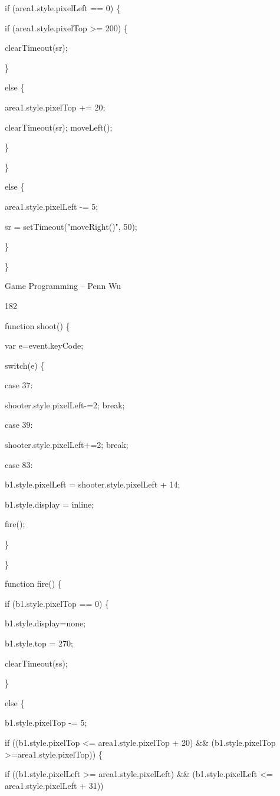 \documentclass[
]{article}
\begin{document}
if (area1.style.pixelLeft == 0) \{

if (area1.style.pixelTop \textgreater= 200) \{

clearTimeout(sr);

\}

else \{

area1.style.pixelTop += 20;

clearTimeout(sr); moveLeft();

\}

\}

else \{

area1.style.pixelLeft -= 5;

sr = setTimeout("moveRight()", 50);

\}

\}

Game Programming -- Penn Wu

182

\protect\hypertarget{index_split_011.htmlux5cux23p183}{}{}function
shoot() \{

var e=event.keyCode;

switch(e) \{

case 37:

shooter.style.pixelLeft-=2; break;

case 39:

shooter.style.pixelLeft+=2; break;

case 83:

b1.style.pixelLeft = shooter.style.pixelLeft + 14;

b1.style.display = \textquotesingle inline\textquotesingle;

fire();

\}

\}

function fire() \{

if (b1.style.pixelTop == 0) \{

b1.style.display=\textquotesingle none\textquotesingle;

b1.style.top = 270;

clearTimeout(ss);

\}

else \{

b1.style.pixelTop -= 5;

if ((b1.style.pixelTop \textless= area1.style.pixelTop + 20) \&\&
(b1.style.pixelTop \textgreater=area1.style.pixelTop)) \{

if ((b1.style.pixelLeft \textgreater= area1.style.pixelLeft) \&\&
(b1.style.pixelLeft \textless= area1.style.pixelLeft + 31))
\end{document}
